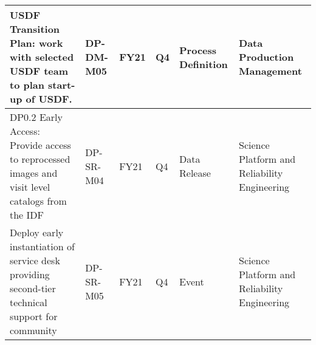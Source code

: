 \begin{longtable} {|p{}|l|l|l|l|l|}
{USDF Transition Plan: work with selected USDF team to plan start-up of USDF.}&{DP-DM-M05}&{FY21}&{Q4}&{Process Definition}&{Data Production Management} \\ \hline
{DP0.2 Early Access: Provide access to reprocessed images and visit level catalogs from the IDF}&{DP-SR-M04}&{FY21}&{Q4}&{Data Release}&{Science Platform and Reliability Engineering} \\ \hline
{Deploy early instantiation of service desk providing second-tier technical support for community}&{DP-SR-M05}&{FY21}&{Q4}&{Event}&{Science Platform and Reliability Engineering} \\ \hline
\end{longtable} \normalsize
